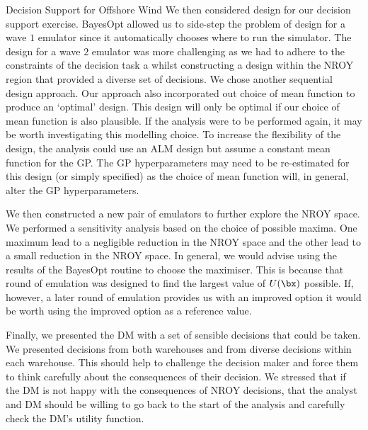 \begin{chapter}{Decision Support for Offshore Wind \label{Ch:ds-for-ow}}
We then considered design for our decision support exercise. BayesOpt allowed us to side-step the problem of design for a wave $1$ emulator since it automatically chooses where to run the simulator. The design for a wave $2$ emulator was more challenging as we had to adhere to the constraints of the decision task a whilst  constructing a design within the NROY region that provided a diverse set of decisions. We chose another sequential design approach. Our approach also incorporated out choice of mean function to produce an `optimal' design. This design will only be optimal if our choice of mean function is also plausible. If the analysis were to be performed again, it may be worth investigating this modelling choice. To increase the flexibility of the design, the analysis could use an ALM design but assume a constant mean function for the GP. The GP hyperparameters may need to be re-estimated for this design (or simply specified) as the choice of mean function will, in general, alter the GP hyperparameters.

We then constructed a new pair of emulators to further explore the NROY space. We performed a sensitivity analysis based on the choice of possible maxima. One maximum lead to a negligible reduction in the NROY space and the other lead to a small reduction in the NROY space. In general, we would advise using the results of the BayesOpt routine to choose the maximiser. This is because that round of emulation was designed to find the largest value of $U(\bx)$ possible. If, however, a later round of emulation provides us with an improved option it would be worth using the improved option as a reference value.

Finally, we presented the DM with a set of sensible decisions that could be taken. We presented decisions from both warehouses and from diverse decisions within each warehouse. This should help to challenge the decision maker and force them to think carefully about the consequences of their decision. We stressed that if the DM is not happy with the consequences of NROY decisions, that the analyst and DM should be willing to go back to the start of the analysis and carefully check the DM's utility function.

\end{chapter}
